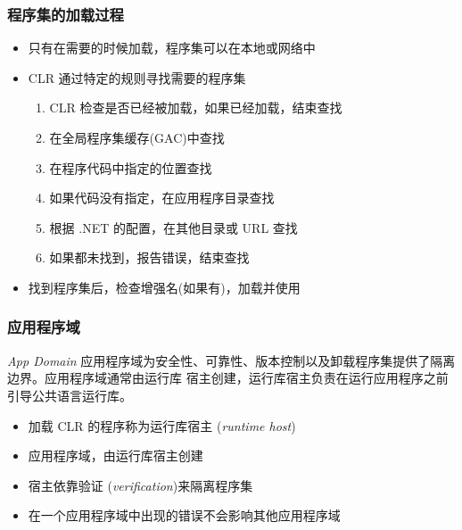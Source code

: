 \begin{frame}
\frametitle{程序集的加载过程}
\begin{itemize}
  \setlength{\itemsep}{8pt plus 1pt}
\item 只有在需要的时候加载，程序集可以在本地或网络中

\item CLR 通过特定的规则寻找需要的程序集

  \begin{enumerate}
    \setlength{\itemsep}{4pt plus 1pt}
  \item CLR 检查是否已经被加载，如果已经加载，结束查找
  \item 在全局程序集缓存(GAC)中查找
  \item 在程序代码中指定的位置查找
  \item 如果代码没有指定，在应用程序目录查找
  \item 根据 .NET 的配置，在其他目录或 URL 查找
  \item 如果都未找到，报告错误，结束查找
  \end{enumerate}

\item 找到程序集后，检查增强名(如果有)，加载并使用
\end{itemize}
\end{frame}


\begin{frame}
\frametitle{应用程序域}
\begin{block}{\textit{App Domain}}
  \CJKindent 应用程序域为安全性、可靠性、版本控制以及卸载程序集提供了隔离边界。应用程序域通常由运行库
  宿主创建，运行库宿主负责在运行应用程序之前引导公共语言运行库。
\end{block}
\begin{itemize}
\item 加载 CLR 的程序称为{运行库宿主} (\textit{runtime host})
\item 应用程序域，由运行库宿主创建
\item 宿主依靠{验证} (\textit{verification})来隔离程序集
\item 在一个应用程序域中出现的错误不会影响其他应用程序域
\end{itemize}
\end{frame}

